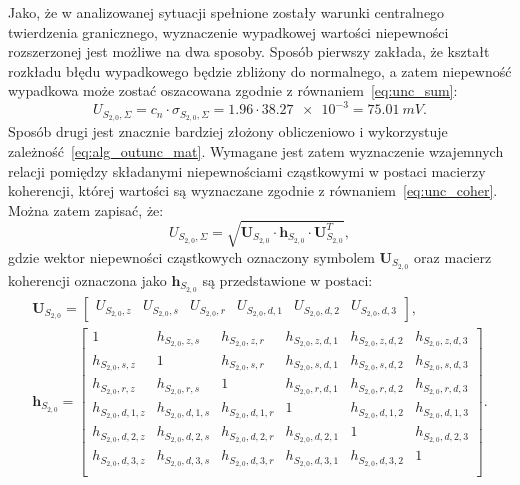 Jako, że w analizowanej sytuacji spełnione zostały warunki centralnego twierdzenia granicznego, wyznaczenie wypadkowej wartości niepewności rozszerzonej jest możliwe na dwa sposoby. Sposób pierwszy zakłada, że kształt rozkładu błędu wypadkowego będzie zbliżony do normalnego, a zatem niepewność wypadkowa może zostać oszacowana zgodnie z równaniem~\eqref{eq:unc_sum}:
\begin{equation}
U_{S_{2,0},\Sigma} = c_{n} \cdot \sigma_{S_{2,0},\Sigma} = 1.96 \cdot \num{38.27e-3} = \qty{75.01}{mV} \label{eq:sym_partd_output_unc_total_a_S_2_0}.
\end{equation}
Sposób drugi jest znacznie bardziej złożony obliczeniowo i wykorzystuje zależność~\eqref{eq:alg_outunc_mat}. Wymagane jest zatem wyznaczenie wzajemnych relacji pomiędzy składanymi niepewnościami cząstkowymi w postaci macierzy koherencji, której wartości są wyznaczane zgodnie z równaniem~\eqref{eq:unc_coher}. Można zatem zapisać, że:
\begin{equation}
U_{S_{2,0},\Sigma} = \sqrt{\mathbf{U}_{S_{2,0}} \cdot \mathbf{h}_{S_{2,0}} \cdot \mathbf{U}_{S_{2,0}}^{T}} \label{eq:sym_partd_output_unc_summul_S_2_0},
\end{equation}
gdzie wektor niepewności cząstkowych oznaczony symbolem $\mathbf{U}_{S_{2,0}}$ oraz macierz koherencji oznaczona jako $\mathbf{h}_{S_{2,0}}$ są przedstawione w postaci:
\begin{gather}
\mathbf{U}_{S_{2,0}} =
\begin{bmatrix}
U_{S_{2,0},z} & U_{S_{2,0},s} & U_{S_{2,0},r} & U_{S_{2,0},d,1} & U_{S_{2,0},d,2} & U_{S_{2,0},d,3}
\end{bmatrix}
\label{eq:sym_partd_output_unc_sumuvect_S_2_0_a}, \\
\mathbf{h}_{S_{2,0}} =
\begin{bmatrix}
1                 & h_{S_{2,0},z,s}   & h_{S_{2,0},z,r}   & h_{S_{2,0},z,d,1} & h_{S_{2,0},z,d,2} & h_{S_{2,0},z,d,3} \\
h_{S_{2,0},s,z}   & 1                 & h_{S_{2,0},s,r}   & h_{S_{2,0},s,d,1} & h_{S_{2,0},s,d,2} & h_{S_{2,0},s,d,3} \\
h_{S_{2,0},r,z}   & h_{S_{2,0},r,s}   & 1                 & h_{S_{2,0},r,d,1} & h_{S_{2,0},r,d,2} & h_{S_{2,0},r,d,3} \\
h_{S_{2,0},d,1,z} & h_{S_{2,0},d,1,s} & h_{S_{2,0},d,1,r} & 1                 & h_{S_{2,0},d,1,2} & h_{S_{2,0},d,1,3} \\
h_{S_{2,0},d,2,z} & h_{S_{2,0},d,2,s} & h_{S_{2,0},d,2,r} & h_{S_{2,0},d,2,1} & 1                 & h_{S_{2,0},d,2,3} \\
h_{S_{2,0},d,3,z} & h_{S_{2,0},d,3,s} & h_{S_{2,0},d,3,r} & h_{S_{2,0},d,3,1} & h_{S_{2,0},d,3,2} & 1                 \\
\end{bmatrix}
\label{eq:sym_partd_output_unc_sumcoher_S_2_0}.
\end{gather}
